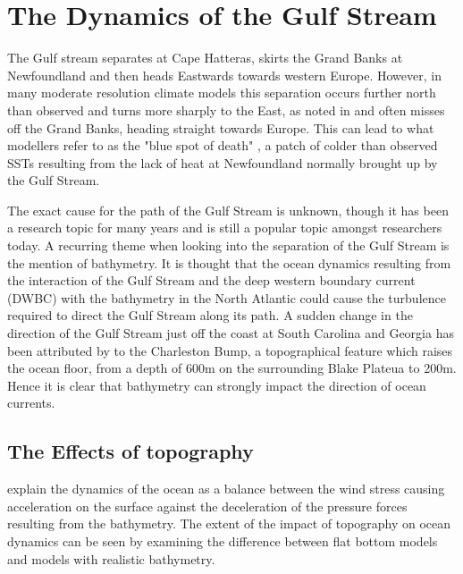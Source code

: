 \documentclass[..\EOYR.tex]{subfiles}
\begin{document}
\section{The Dynamics of the Gulf Stream}

The Gulf stream separates at Cape Hatteras, skirts the Grand Banks at Newfoundland and then heads Eastwards towards western Europe. However, in many moderate resolution climate models this separation occurs further north than observed and turns more sharply to the East, as noted in \citep{Hurlburt2008} and often misses off the Grand Banks, heading straight towards Europe. This can lead to what modellers refer to as the "blue spot of death" \citep{Gnanadesikan2007}, a patch of colder than observed SSTs resulting from the lack of heat at Newfoundland normally brought up by the Gulf Stream.

The exact cause for the path of the Gulf Stream is unknown, though it has been a research topic for many years and is still a popular topic amongst researchers today. A recurring theme when looking into the separation of the Gulf Stream is the mention of bathymetry. It is thought \citep{Gula2014}\citep{NaveiraGarabato2013}\citep{Nikurashin2012a} that the ocean dynamics resulting from the interaction of the Gulf Stream and the deep western boundary current (DWBC) with the bathymetry in the North Atlantic could cause the turbulence required to direct the Gulf Stream along its path. A sudden change in the direction of the Gulf Stream just off the coast at South Carolina and Georgia has been attributed by \citep{Gula2014} to the Charleston Bump, a topographical feature which raises the ocean floor, from a depth of 600m on the surrounding Blake Plateua to 200m. Hence it is clear that bathymetry can strongly impact the direction of ocean currents.



\subsection{The Effects of topography}

\citep{NaveiraGarabato2013} explain the dynamics of the ocean as a balance between the wind stress causing acceleration on the surface against the deceleration of the pressure forces resulting from the bathymetry.
The extent of the impact of topography on ocean dynamics can be seen by examining the difference between flat bottom models and models with realistic bathymetry.
\end{document}
